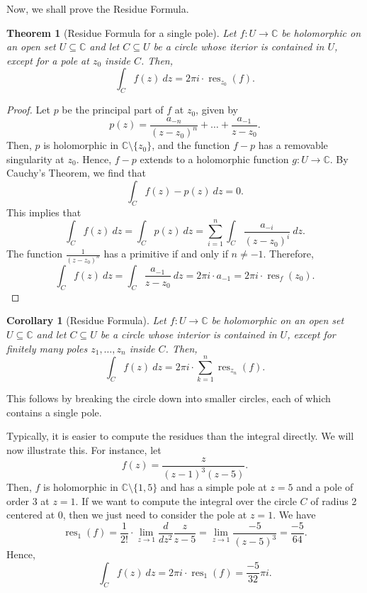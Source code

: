 \documentclass[a4paper, openany]{memoir}
\theoremstyle{definition}
\theoremstyle{plain}
\newtheorem{theorem}[definition]{Theorem}
\newtheorem{corollary}[definition]{Corollary}
\begin{document}
    Now, we shall prove the Residue Formula.
    \begin{theorem}[Residue Formula for a single pole]
        Let $f \colon U \to \mathbb{C}$ be holomorphic on an open set $U \subseteq \mathbb{C}$ and let $C \subseteq U$ be a circle whose iterior is contained in $U$, except for a pole at $z_0$ inside $C$. Then,
        \[\int_C f(z) \ dz = 2\pi i \cdot \operatorname{res}_{z_0}(f).\]
    \end{theorem}
    \begin{proof}
        Let $p$ be the principal part of $f$ at $z_0$, given by
        \[p(z) = \frac{a_{-n}}{(z - z_0)^n} + \dots + \frac{a_{-1}}{z - z_0}.\]
        Then, $p$ is holomorphic in $\mathbb{C} \setminus \{z_0\}$, and the function $f - p$ has a removable singularity at $z_0$. Hence, $f - p$ extends to a holomorphic function $g \colon U \to \mathbb{C}$. By Cauchy's Theorem, we find that
        \[\int_C f(z) - p(z) \ dz = 0.\]
        This implies that
        \[\int_C f(z) \ dz = \int_C p(z) \ dz = \sum_{i=1}^n \int_C \frac{a_{-i}}{(z - z_0)^i} \ dz.\]
        The function $\frac{1}{(z - z_0)^n}$ has a primitive if and only if $n \neq -1$. Therefore,
        \[\int_C f(z) \ dz = \int_C \frac{a_{-1}}{z - z_0} \ dz = 2\pi i \cdot a_{-1} = 2\pi i \cdot \operatorname{res}_f(z_0).\]
    \end{proof}
    \begin{corollary}[Residue Formula]
        Let $f \colon U \to \mathbb{C}$ be holomorphic on an open set $U \subseteq \mathbb{C}$ and let $C \subseteq U$ be a circle whose interior is contained in $U$, except for finitely many poles $z_1, \dots, z_n$ inside $C$. Then,
        \[\int_C f(z) \ dz = 2\pi i \cdot \sum_{k=1}^n \operatorname{res}_{z_n}(f).\]
    \end{corollary}
    \noindent This follows by breaking the circle down into smaller circles, each of which contains a single pole.

    Typically, it is easier to compute the residues than the integral directly. We will now illustrate this. For instance, let
    \[f(z) = \frac{z}{(z - 1)^3 (z - 5)}.\]
    Then, $f$ is holomorphic in $\mathbb{C} \setminus \{1, 5\}$ and has a simple pole at $z = 5$ and a pole of order 3 at $z = 1$. If we want to compute the integral over the circle $C$ of radius 2 centered at 0, then we just need to consider the pole at $z = 1$. We have
    \[\operatorname{res}_1(f) = \frac{1}{2!} \cdot \lim_{z \to 1} \frac{d}{dz^2} \frac{z}{z-5} = \lim_{z \to 1} \frac{-5}{(z - 5)^3}= \frac{-5}{64}.\]
    Hence,
    \[\int_C f(z) \ dz = 2\pi i \cdot \operatorname{res}_1(f) = \frac{-5}{32} \pi i.\]
\end{document}
